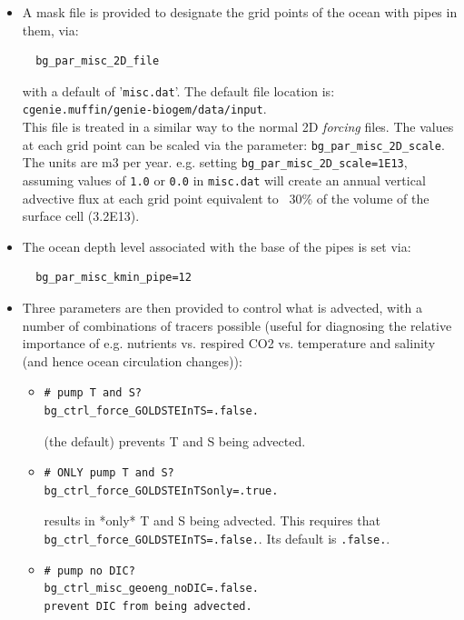 \documentclass[11pt,fleqn]{book} %
\begin{document}
\begin{itemize}

        \item A mask file is provided to designate the grid points of the ocean with pipes in them, via:
        \vspace{-5pt}\begin{verbatim}
  bg_par_misc_2D_file
        \end{verbatim}\vspace{-5pt}
        with a default of '\texttt{misc.dat}'. The default file location is:
        \\\texttt{cgenie.muffin/genie-biogem/data/input}.
        \\This file is treated in a similar way to the normal 2D \textit{forcing} files. The values at each grid point can be scaled via the parameter: \texttt{bg\_par\_misc\_2D\_scale}.
        The units are m3 per year. e.g. setting \texttt{bg\_par\_misc\_2D\_scale=1E13}, assuming values of \texttt{1.0} or \texttt{0.0} in \texttt{misc.dat} will create an annual vertical advective flux at each grid point equivalent to ~30\% of the volume of the surface cell (3.2E13).
        \item The ocean depth level associated with the base of the pipes is set via:
        \vspace{-5pt}\begin{verbatim}
  bg_par_misc_kmin_pipe=12
        \end{verbatim}\vspace{-5pt}
        \item Three parameters are then provided to control what is advected, with a number of combinations of tracers possible (useful for diagnosing the relative importance of e.g. nutrients vs. respired CO2 vs. temperature and salinity (and hence ocean circulation changes)):
        
          \begin{itemize}
        \item 
        \vspace{-5pt}\begin{verbatim}
# pump T and S?
bg_ctrl_force_GOLDSTEInTS=.false.
        \end{verbatim}
 (the default) prevents T and S being advected.
        \item 
        \vspace{-5pt}\begin{verbatim}
# ONLY pump T and S?
bg_ctrl_force_GOLDSTEInTSonly=.true.
        \end{verbatim}
        results in *only* T and S being advected. This requires that \texttt{bg\_ctrl\_force\_GOLDSTEInTS=.false.}. Its default is \texttt{.false.}.
        \item 
        \vspace{-5pt}\begin{verbatim}
# pump no DIC?
bg_ctrl_misc_geoeng_noDIC=.false.
prevent DIC from being advected.
        \end{verbatim}


\end{itemize}
\end{itemize}
\end{document}
